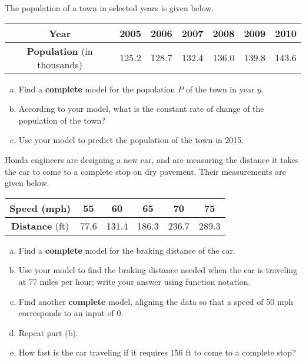 \documentclass[notes]{subfiles}
\begin{document}
		\begin{ex}
			The population of a town in selected years is given below.
			\begin{center}
				{\renewcommand{\arraystretch}{1.2}
				\begin{tabular}{|c||c|c|c|c|c|c|}\hline
					\textbf{Year} & 2005 & 2006 & 2007 & 2008 & 2009 & 2010\\ \hline
					\textbf{Population} (in thousands) & 125.2 & 128.7 & 132.4 & 136.0 & 139.8 & 143.6\\ \hline
				\end{tabular}
				}
			\end{center}
			\begin{enumerate}[(a)]
				\item Find a \textbf{complete} model for the population $P$ of the town in year $y$.
				\item According to your model, what is the constant rate of change of the population of the town?
				\item Use your model to predict the population of the town in 2015.
			\end{enumerate}	
		\end{ex}

		\begin{ex}
			Honda engineers are designing a new car, and are measuring the distance it takes the car to come to a complete stop on dry pavement.  Their measurements are given below.
			\begin{center}
				{\renewcommand{\arraystretch}{1.2}
				\begin{tabular}{|c|c|c|c|c|c|}\hline
					\textbf{Speed} (mph) & 55 & 60 & 65 & 70 & 75 \\ \hline				
					\textbf{Distance} (ft) & 77.6 & 131.4 & 186.3 & 236.7 & 289.3\\ \hline
				\end{tabular}
				}
			\end{center}
			\begin{enumerate}[(a)]
				\item Find a \textbf{complete} model for the braking distance of the car.
					\vs{1}
				\item Use your model to find the braking distance needed when the car is traveling at 77 miles per hour; write your answer using function notation.
					\vs{.5}
				\item Find another \textbf{complete} model, aligning the data so that a speed of 50 mph corresponds to an input of 0.
					\vs{1}
				\item Repeat part (b).
					\vs{.5}
				\item How fast is the car traveling if it requires 156 ft to come to a complete stop?
					\vs{.5}
			\end{enumerate}
		\end{ex}
	\clearpage	
\end{document}
